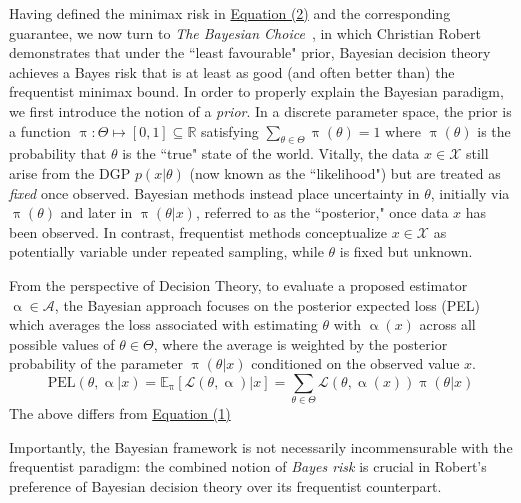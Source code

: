 \documentclass[letterpaper,12pt]{article}
\newcommand{\given}{|}
\begin{document}
Having defined the minimax risk in \hyperref[eq:minimaxrisk]{Equation (2)} and the corresponding guarantee, we now turn to \textit{The Bayesian Choice} \cite{robert2007bayesian}, in which Christian Robert demonstrates that under the ``least favourable" prior, Bayesian decision theory achieves a Bayes risk that is at least as good (and often better than) the frequentist minimax bound. In order to properly explain the Bayesian paradigm, we first introduce the notion of a \textit{prior}. In a discrete parameter space, the prior is a function $\uppi: \Theta \mapsto [0,1] \subseteq \mathbb{R}$ satisfying $\sum_{\theta \in \Theta} \uppi (\theta) = 1$ where $\uppi(\theta)$ is the probability that $\theta$ is the ``true" state of the world. Vitally, the data $x \in \mathcal{X}$ still arise from the DGP $p(x \given \theta)$ (now known as the ``likelihood") but are treated as \textit{fixed} once observed. Bayesian methods instead place uncertainty in $\theta$, initially via $\uppi(\theta)$ and later in $\uppi(\theta \given x)$, referred to as the ``posterior," once data $x$ has been observed.  In contrast, frequentist methods conceptualize $x \in \mathcal{X}$ as potentially variable under repeated sampling, while $\theta$ is fixed but unknown.


From the perspective of Decision Theory, to evaluate a proposed estimator $\upalpha \in \mathcal{A}$, the Bayesian approach focuses on the posterior expected loss (PEL) which averages the loss associated with estimating $\theta$ with $\upalpha(x)$ across all possible values of $\theta \in \Theta$, where the average is weighted by the posterior probability of the parameter $\uppi(\theta \given x)$ conditioned on the observed value $x$. 
\begin{equation}
\text{PEL}(\theta, \upalpha \given x) = \mathbb{E}_{\uppi}[\mathcal{L}(\theta, \upalpha)\given x] = \sum_{\theta \in \Theta} \mathcal{L}(\theta, \upalpha(x)) \uppi(\theta \given x)
 \end{equation}
The above differs from \hyperref[eq:freqexpectedloss]{Equation (1)}


Importantly, the Bayesian framework is not necessarily incommensurable with the frequentist paradigm: the combined notion of \textit{Bayes risk} is crucial in Robert's preference of Bayesian decision theory over its frequentist counterpart. 
\end{document}
